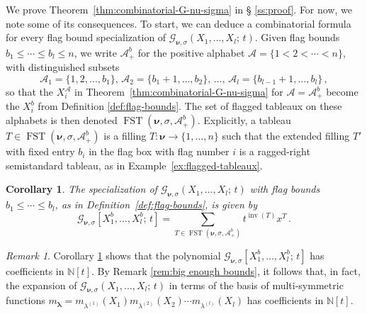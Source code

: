 \documentclass[12pt]{amsart}
\newtheorem{cor}[thm]{Corollary}
\theoremstyle{definition}
\theoremstyle{remark}
\newtheorem{remark}[thm]{Remark}
\newcommand{\NN}{{\mathbb N}}
\newcommand{\lambold}{{\boldsymbol \lambda }}
\newcommand{\nubold}{{\boldsymbol \nu }}
\newcommand{\Acal}{{\mathcal A}}
\newcommand{\Gcal}{{\mathcal G}}
\DeclareMathOperator{\inv}{inv}
\DeclareMathOperator{\FSST}{FST}
\begin{document}
We prove Theorem~\ref{thm:combinatorial-G-nu-sigma} in \S
\ref{ss:proof}.  For now, we note some of its consequences. To start,
we can deduce a combinatorial formula for every flag bound
specialization of $\Gcal _{\nubold ,\sigma }(X_{1},\ldots,X_{l};\,
t)$.  Given flag bounds $b_{1}\leq \cdots \leq b_{l}\leq n$, we write
$\Acal _{+}^{b}$ for the positive alphabet $\Acal = \{1<2<\cdots
<n\}$, with distinguished subsets
\begin{equation}\label{e:A-plus-b}
\Acal_1 = \{1, 2,\dots, b_1\}, \,\Acal_2 = \{b_1+1, \dots,
b_2\},\, \ldots,\, \Acal_l = \{b_{l-1}+1, \dots, b_l\}\, ,
\end{equation}
so that the $X^\Acal _i$ in Theorem~\ref{thm:combinatorial-G-nu-sigma}
for $\Acal = \Acal_+^b$ become the $X_i^b$ from Definition
\ref{def:flag-bounds}.  The set of flagged tableaux on these alphabets
is then denoted $\FSST (\nubold ,\sigma,\Acal_+^b)$.  Explicitly, a
tableau $T \in \FSST (\nubold ,\sigma,\Acal_+^b)$ is a filling
$T\colon \nubold \rightarrow \{1, \ldots, n\}$ such that the extended
filling $T'$ with fixed entry $b_{i}$ in the flag box with flag number
$i$ is a ragged-right semistandard tableau, as in
Example~\ref{ex:flagged-tableaux}.


\begin{cor}\label{cor:G-nu-sigma-flag-bounds}
The specialization of $\Gcal _{\nubold ,\sigma }(X_{1},\ldots,X_{l};\,
t)$ with flag bounds $b_{1}\leq \cdots \leq b_{l}$, as in
Definition~\ref{def:flag-bounds}, is given by
\begin{equation}\label{e:flag-bound-G-nu-sigma}
\Gcal _{\nubold ,\sigma }[X_{1}^b, \ldots, X_{l}^b;\, t] = \sum _{T\in
\FSST(\nubold , \sigma,\mathcal A_+^b) } t^{\inv (T)} x^{T}\,.
\end{equation}
\end{cor}

\begin{remark}\label{rem:monomial-positive}
Corollary \ref{cor:G-nu-sigma-flag-bounds} shows that the polynomial
$\Gcal _{\nubold ,\sigma }[X^{b}_{1}, \ldots, X^{b}_{l};\, t]$ has
coefficients in $\NN [t]$.  By Remark \ref{rem:big enough bounds}, it
follows that, in fact, the expansion of $\Gcal _{\nubold ,\sigma
}(X_{1}, \ldots, X_{l};\, t)$ in terms of the basis of multi-symmetric
functions $m_{\lambold } = m_{\lambda^{(1)}}(X_1)
m_{\lambda^{(2)}}(X_2) \cdots m_{\lambda^{(l)}}(X_l)$ has coefficients
in $\NN [t]$.
\end{remark}
\end{document}
